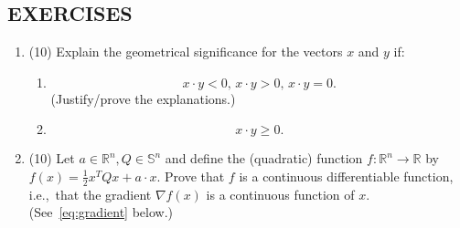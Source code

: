 \documentclass[12pt]{article}
\newtheorem*{solution}{Solution}
\newtheorem*{comments}{Comments}
\numberwithin{equation}{section}  %
\numberwithin{table}{section}
\numberwithin{algorithm}{section}
\def\R{\mathbb{R}}
\def\Sc{\mathbb{S}}
\def\Sn{\Sc^n}
\def\Rn{\mathbb{R}^n}
\theoremstyle{definition}
\newcommand{\<}{\langle}
\renewcommand{\>}{\rangle}
\begin{document}
\subsection{EXERCISES}
\begin{enumerate}
\item (10)
Explain the geometrical significance for the vectors $x$ and $y$ if:
\begin{enumerate}
\item
\[x \cdot y < 0, \, x \cdot y > 0, \, x \cdot y = 0.
\]
(Justify/prove the explanations.)
\item
\[x \cdot y \geq 0. \]
\end{enumerate}
\item
(10) 
Let $a\in \Rn, Q\in \Sn$ and define the (quadratic)
function $f: \Rn \rightarrow \R$ by 
$f(x) = \frac 12 x^TQx + a \cdot x$.
Prove that $f$ is a continuous differentiable function, i.e.,~that the
gradient $\nabla f(x)$ is a continuous function of $x$.
(See~\cref{eq:gradient} below.)
\end{enumerate}
\end{document}
